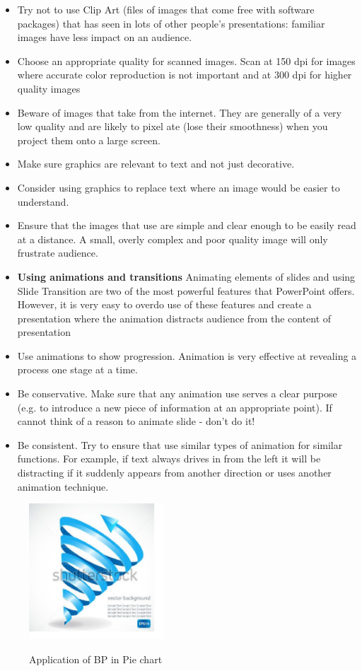 \begin{itemize}
  \item Try not to use Clip Art (files of images that come free with software packages) that has seen in lots of other people's presentations: familiar images have less impact on an audience.
  \item Choose an appropriate quality for scanned images. Scan at 150 dpi for images where accurate color reproduction is not important and at 300 dpi for higher quality images
    \item Beware of images that take from the internet. They are generally of a very low quality and are likely to pixel ate (lose their smoothness) when you project them onto a large screen.
  \item Make sure graphics are relevant to text and not just decorative.
  \item Consider using graphics to replace text where an image would be easier to understand.
  \item Ensure that the images that use are simple and clear enough to be easily read at a distance. A small, overly complex and poor quality image will only frustrate audience.
  \item \textbf{Using animations and transitions}
Animating elements of slides and using Slide Transition are two of the most powerful features that PowerPoint offers. However, it is very easy to overdo use of these features and create a presentation where the animation distracts audience from the content of presentation
  \item Use animations to show progression. Animation is very effective at revealing a process one stage at a time.
  \item Be conservative. Make sure that any animation use serves a clear purpose (e.g. to introduce a new piece of information at an appropriate point). If cannot think of a reason to animate slide - don't do it!
\item Be consistent. Try to ensure that use similar types of animation for similar functions. For example, if text always drives in from the left it will be distracting if it suddenly appears from another direction or uses another animation technique.
\end{itemize}

\begin{figure}
  \includegraphics[width=2in]{figure8.eps} \cite  { Shelley Fishel}
  \caption {Application of BP in Pie chart}\label{3.8}
\end{figure}



